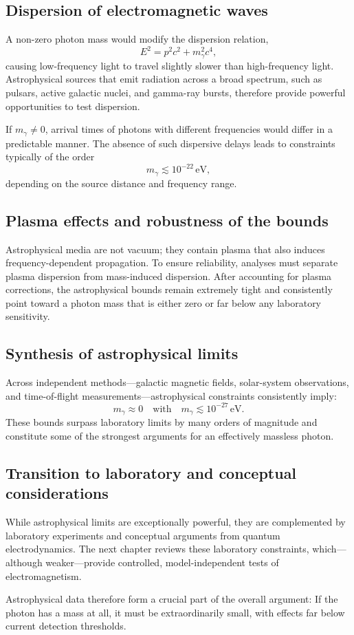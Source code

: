 \subsection*{Dispersion of electromagnetic waves}

A non-zero photon mass would modify the dispersion relation,
\[
E^2 = p^2 c^2 + m_\gamma^2 c^4,
\]
causing low-frequency light to travel slightly slower than high-frequency 
light. Astrophysical sources that emit radiation across a broad spectrum, 
such as pulsars, active galactic nuclei, and gamma-ray bursts, therefore 
provide powerful opportunities to test dispersion.

If $m_\gamma \neq 0$, arrival times of photons with different frequencies 
would differ in a predictable manner. The absence of such dispersive delays 
leads to constraints typically of the order
\[
m_\gamma \lesssim 10^{-22} \,\text{eV},
\]
depending on the source distance and frequency range.

\subsection*{Plasma effects and robustness of the bounds}

Astrophysical media are not vacuum; they contain plasma that also induces 
frequency-dependent propagation. To ensure reliability, analyses must 
separate plasma dispersion from mass-induced dispersion. After accounting 
for plasma corrections, the astrophysical bounds remain extremely tight and 
consistently point toward a photon mass that is either zero or far below any 
laboratory sensitivity.

\subsection*{Synthesis of astrophysical limits}

Across independent methods—galactic magnetic fields, solar-system 
observations, and time-of-flight measurements—astrophysical constraints 
consistently imply:
\[
m_\gamma \approx 0 \quad \text{with} \quad m_\gamma \lesssim 10^{-27}\,\text{eV}.
\]
These bounds surpass laboratory limits by many orders of magnitude and 
constitute some of the strongest arguments for an effectively massless 
photon.

\subsection*{Transition to laboratory and conceptual considerations}

While astrophysical limits are exceptionally powerful, they are complemented 
by laboratory experiments and conceptual arguments from quantum 
electrodynamics. The next chapter reviews these laboratory constraints, 
which—although weaker—provide controlled, model-independent tests of 
electromagnetism.

Astrophysical data therefore form a crucial part of the overall argument: 
If the photon has a mass at all, it must be extraordinarily small, with 
effects far below current detection thresholds.
